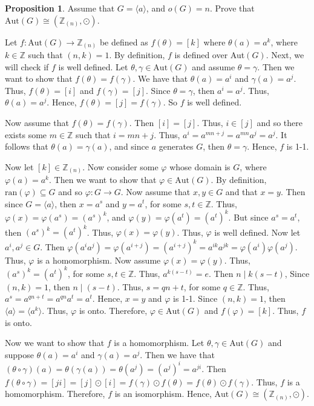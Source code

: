 \documentclass{article}
\makeatletter
\theoremstyle{definition}
\newtheorem{prop}{Proposition}[section]
\theoremstyle{remark}
\let\oldproofname=\proofname
\renewcommand{\proofname}{\bf{\textit{\oldproofname}}}
\theoremstyle{definition}
\renewenvironment{proof}[1][\proofname]{\par
  \pushQED{\qed}%
  \normalfont \topsep6\p@\@plus6\p@\relax
  \list{}{\leftmargin=0mm
          \rightmargin=0mm
          \settowidth{\itemindent}{\itshape#1}%
          \labelwidth=4mm
          \parsep=0pt \listparindent=0mm%
  }
  \item[\hskip\labelsep
        \itshape
    #1\@addpunct{.}]\ignorespaces
}{%
  \popQED\endlist\@endpefalse
}
\makeatother
\begin{document}
    \begin{prop}\label{prop:2.5}
        Assume that $G=\langle a\rangle$, and $o(G)=n$. Prove that $\text{Aut}(G)\cong (\mathbb{Z}_{(n)},\odot)$.
    \end{prop}
        \begin{proof}
            Let $f\colon\text{Aut}(G)\rightarrow\mathbb{Z}_{(n)}$ be defined as $f(\theta)=[k]$ where $\theta(a)=a^k$, where $k\in\mathbb{Z}$ such that $(n,k)=1$. By definition, $f$ is defined over Aut$(G)$. Next, we will check if $f$ is well defined. Let $\theta,\gamma\in\text{Aut}(G)$ and assume $\theta=\gamma$. Then we want to show that $f(\theta)=f(\gamma)$. We have that $\theta(a)=a^i$ and $\gamma(a)=a^j$. Thus, $f(\theta)=[i]$ and $f(\gamma)=[j]$. Since $\theta=\gamma$, then $a^i=a^j$. Thus, $\theta(a)=a^j$. Hence, $f(\theta)=[j]=f(\gamma)$. So $f$ is well defined.\par\hspace{4mm} Now assume that $f(\theta)=f(\gamma)$. Then $[i]=[j]$. Thus, $i\in[j]$ and so there exists some $m\in\mathbb{Z}$ such that $i=mn+j$. Thus, $a^{i}=a^{mn+j}=a^{mn}a^j=a^j$. It follows that $\theta(a)=\gamma(a)$, and since $a$ generates $G$, then $\theta=\gamma$. Hence, $f$ is 1-1.\par\hspace{4mm} Now let $[k]\in\mathbb{Z}_{(n)}$. Now consider some $\varphi$ whose domain is $G$, where $\varphi(a)=a^k$. Then we want to show that $\varphi\in\text{Aut}(G)$. By definition, $\text{ran}(\varphi)\subseteq G$ and so $\varphi\colon G\rightarrow G$. Now assume that $x,y\in G$ and that $x=y$. Then since $G=\langle a\rangle$, then $x=a^s$ and $y=a^t$, for some $s,t\in\mathbb{Z}$. Thus, $\varphi(x)=\varphi(a^s)=(a^s)^k$, and $\varphi(y)=\varphi(a^t)=(a^t)^k$. But since $a^s=a^t$, then $(a^s)^k=(a^t)^k$. Thus, $\varphi(x)=\varphi(y)$. Thus, $\varphi$ is well defined. Now let $a^i,a^j\in G$. Then $\varphi(a^ia^j)=\varphi(a^{i+j})=(a^{i+j})^k=a^{ik}a^{jk}=\varphi(a^i)\varphi(a^j)$. Thus, $\varphi$ is a homomorphism. Now assume $\varphi(x)=\varphi(y)$. Thus, $(a^s)^k=(a^t)^k$, for some $s,t\in\mathbb{Z}$. Thus, $a^{k(s-t)}=e$. Then $n\mid k(s-t)$, Since $(n,k)=1$, then $n\mid(s-t)$. Thus, $s=qn+t$, for some $q\in\mathbb{Z}$. Thus, $a^s=a^{qn+t}=a^{qn}a^t=a^t$. Hence, $x=y$ and $\varphi$ is 1-1. Since $(n,k)=1$, then $\langle a\rangle=\langle a^k\rangle$. Thus, $\varphi$ is onto. Therefore, $\varphi\in\text{Aut}(G)$ and $f(\varphi)=[k]$. Thus, $f$ is onto.\par\hspace{4mm} Now we want to show that $f$ is a homomorphism. Let $\theta,\gamma\in\text{Aut}(G)$ and suppose $\theta(a)=a^i$ and $\gamma(a)=a^j$. Then we have that $(\theta\circ\gamma)(a)=\theta(\gamma(a))=\theta(a^j)=(a^j)^i=a^{ji}$. Then $f(\theta\circ\gamma)=[ji]=[j]\odot[i]=f(\gamma)\odot f(\theta)=f(\theta)\odot f(\gamma)$. Thus, $f$ is a homomorphism. Therefore, $f$ is an isomorphism. Hence, $\text{Aut}(G)\cong(\mathbb{Z}_{(n)},\odot)$. 
        \end{proof}
        
\end{document}
